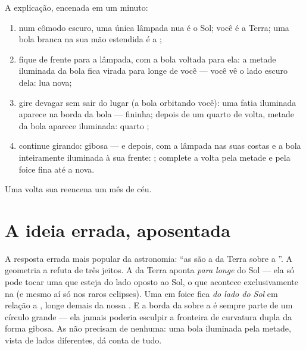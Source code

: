 \begin{method}\label{met:g7:moon-phases:walk}
A explicação, encenada em um minuto:
\begin{enumerate}
  \item num cômodo escuro, uma única lâmpada nua é o Sol; você é a
        Terra; uma bola branca na sua mão estendida é a ;
  \item fique de frente para a lâmpada, com a bola voltada para ela:
        a metade iluminada da bola fica virada para longe de você ---
        você vê o lado escuro dela: lua nova;
  \item gire devagar sem sair do lugar (a bola orbitando você): uma
        fatia iluminada aparece na borda da bola --- 
        fininha; depois de um quarto de volta, metade da bola aparece
        iluminada: quarto ;
  \item continue girando: gibosa --- e depois, com a lâmpada nas suas
        costas e a bola inteiramente iluminada à sua frente: ; complete a volta pela metade  e pela foice
        fina até a nova.
\end{enumerate}
Uma volta sua reencena um mês de céu.
\end{method}

\section{A ideia errada, aposentada}

\begin{proposition}\label{prop:g7:moon-phases:notshadow}
A resposta errada mais popular da astronomia: ``as  são a 
da Terra sobre a ''. A geometria a refuta de três jeitos. A 
da Terra aponta \emph{para longe} do Sol --- ela só pode tocar uma
 que esteja do lado oposto ao Sol, o que acontece exclusivamente
na  (e mesmo aí só nos raros eclipses). Uma  em foice
fica \emph{do lado do Sol} em relação a , longe demais da nossa
. E a borda da  sobre a  é sempre parte de um círculo
grande --- ela jamais poderia esculpir a fronteira de curvatura dupla
da forma gibosa. As  não precisam de  nenhuma: uma bola
iluminada pela metade, vista de lados diferentes, dá conta de tudo.
\end{proposition}

